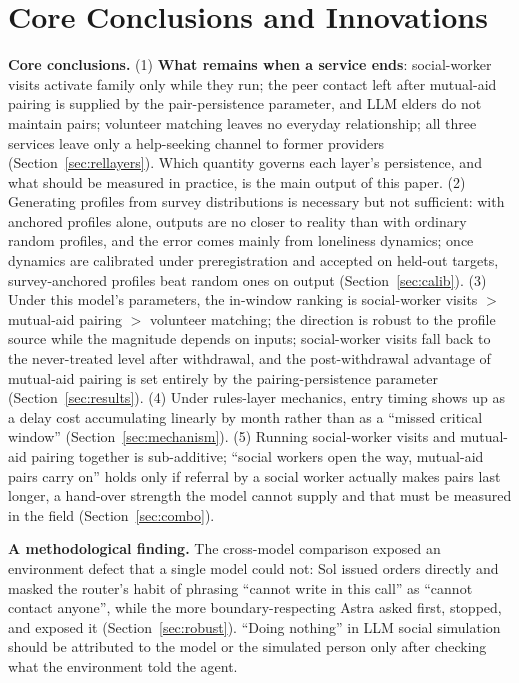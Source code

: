 \documentclass[10pt,twocolumn]{article}
\begin{document}
\section{Core Conclusions and Innovations}\label{sec:core}
\textbf{Core conclusions.} (1) \textbf{What remains when a service ends}: social-worker visits activate family only while they run; the peer contact left after mutual-aid pairing is supplied by the pair-persistence parameter, and LLM elders do not maintain pairs; volunteer matching leaves no everyday relationship; all three services leave only a help-seeking channel to former providers (Section~\ref{sec:rellayers}). Which quantity governs each layer's persistence, and what should be measured in practice, is the main output of this paper. (2) Generating profiles from survey distributions is necessary but not sufficient: with anchored profiles alone, outputs are no closer to reality than with ordinary random profiles, and the error comes mainly from loneliness dynamics; once dynamics are calibrated under preregistration and accepted on held-out targets, survey-anchored profiles beat random ones on output (Section~\ref{sec:calib}). (3) Under this model's parameters, the in-window ranking is social-worker visits $>$ mutual-aid pairing $>$ volunteer matching; the direction is robust to the profile source while the magnitude depends on inputs; social-worker visits fall back to the never-treated level after withdrawal, and the post-withdrawal advantage of mutual-aid pairing is set entirely by the pairing-persistence parameter (Section~\ref{sec:results}). (4) Under rules-layer mechanics, entry timing shows up as a delay cost accumulating linearly by month rather than as a ``missed critical window'' (Section~\ref{sec:mechanism}). (5) Running social-worker visits and mutual-aid pairing together is sub-additive; ``social workers open the way, mutual-aid pairs carry on'' holds only if referral by a social worker actually makes pairs last longer, a hand-over strength the model cannot supply and that must be measured in the field (Section~\ref{sec:combo}).

\textbf{A methodological finding.} The cross-model comparison exposed an environment defect that a single model could not: Sol issued orders directly and masked the router's habit of phrasing ``cannot write in this call'' as ``cannot contact anyone'', while the more boundary-respecting Astra asked first, stopped, and exposed it (Section~\ref{sec:robust}). ``Doing nothing'' in LLM social simulation should be attributed to the model or the simulated person only after checking what the environment told the agent.
\end{document}
